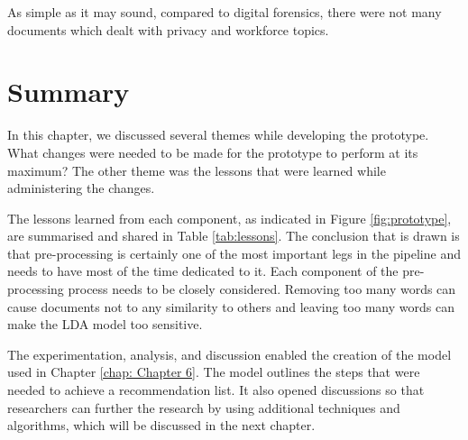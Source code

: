 As simple as it may sound, compared to digital forensics, there were not many documents which dealt with privacy and workforce topics.

\section{Summary}

In this chapter, we discussed several themes while developing the prototype. What changes were needed to be made for the prototype to perform at its maximum? The other theme was the lessons that were learned while administering the changes.

The lessons learned from each component, as indicated in Figure \ref{fig:prototype}, are summarised and shared in Table \ref{tab:lessons}. The conclusion that is drawn is that pre-processing is certainly one of the most important legs in the pipeline and needs to have most of the time dedicated to it. Each component of the pre-processing process needs to be closely considered. Removing too many words can cause documents not to any similarity to others and leaving too many words can make the LDA model too sensitive.

The experimentation, analysis, and discussion enabled the creation of the model used in Chapter \ref{chap: Chapter 6}. The model outlines the steps that were needed to achieve a recommendation list. It also opened discussions so that researchers can further the research by using additional techniques and algorithms, which will be discussed in the next chapter.

